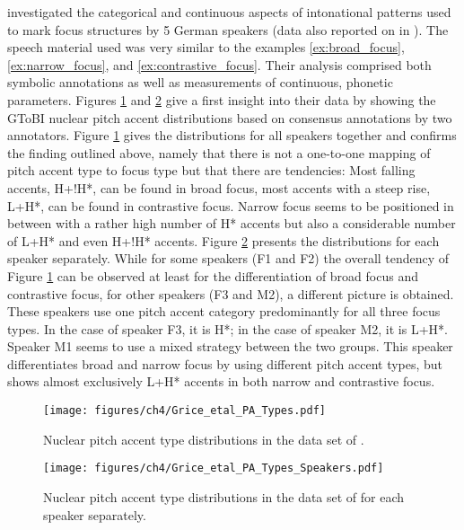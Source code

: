 \citet{Griceetal2017} investigated the categorical and continuous aspects of intonational patterns used to mark focus structures by 5 German speakers (data also reported on in \citealp{MückeGrice2014}). The speech material used was very similar to the examples \ref{ex:broad_focus}, \ref{ex:narrow_focus}, and \ref{ex:contrastive_focus}. Their analysis comprised both symbolic annotations as well as measurements of continuous, phonetic parameters. Figures \ref{fig:grice_etal_2017_PA_types} and \ref{fig:grice_etal_2017_PA_types_speakers} give a first insight into their data by showing the GToBI nuclear pitch accent distributions based on consensus annotations by two annotators. Figure \ref{fig:grice_etal_2017_PA_types} gives the distributions for all speakers together and confirms the finding outlined above, namely that there is not a one-to-one mapping of pitch accent type to focus type but that there are tendencies: Most falling accents, H+!H*, can be found in broad focus, most accents with a steep rise, L+H*, can be found in contrastive focus. Narrow focus seems to be positioned in between with a rather high number of H* accents but also a considerable number of L+H* and even H+!H* accents. Figure \ref{fig:grice_etal_2017_PA_types_speakers} presents the distributions for each speaker separately. While for some speakers (F1 and F2) the overall tendency of Figure \ref{fig:grice_etal_2017_PA_types} can be observed at least for the differentiation of broad focus and contrastive focus, for other speakers (F3 and M2), a different picture is obtained. These speakers use one pitch accent category predominantly for all three focus types. In the case of speaker F3, it is H*; in the case of speaker M2, it is L+H*. Speaker M1 seems to use a mixed strategy between the two groups. This speaker differentiates broad and\largerpage{} narrow focus by using different pitch accent types, but shows almost exclusively L+H* accents in both narrow and contrastive focus.

\begin{figure}[p]
\texttt{[image: figures/ch4/Grice\_etal\_PA\_Types.pdf]}
\caption{Nuclear pitch accent type distributions in the data set of \citet{Griceetal2017}.}
\label{fig:grice_etal_2017_PA_types}
\end{figure}

\begin{figure}[p]
\texttt{[image: figures/ch4/Grice\_etal\_PA\_Types\_Speakers.pdf]}
\caption{Nuclear pitch accent type distributions in the data set of \citet{Griceetal2017} for each speaker separately.}
\label{fig:grice_etal_2017_PA_types_speakers}
\end{figure}

